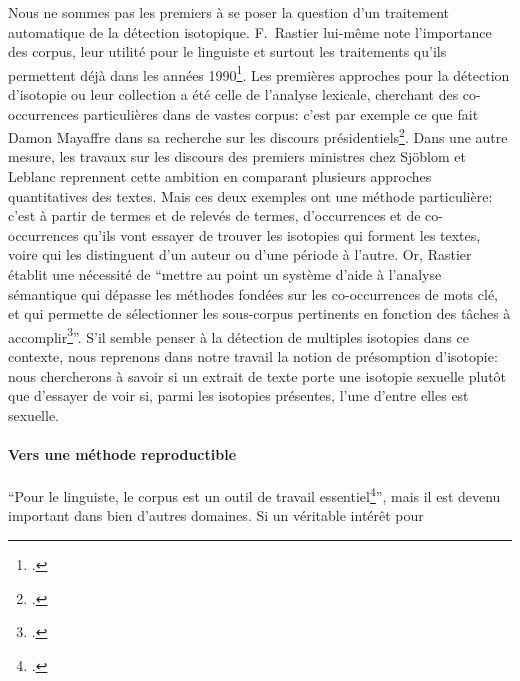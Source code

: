 Nous ne sommes pas les premiers à se poser la question d'un traitement automatique de la détection isotopique. F.~Rastier lui-même note l'importance des corpus, leur utilité pour le linguiste et surtout les traitements qu'ils permettent déjà dans les années 1990\footcite{rastier_semantique_1996}. Les premières approches pour la détection d'isotopie ou leur collection a été celle de l'analyse lexicale, cherchant des co-occurrences particulières dans de vastes corpus: c'est par exemple ce que fait Damon Mayaffre dans sa recherche sur les discours présidentiels\footcite{mayaffre2008occurrence}. Dans une autre mesure, les travaux sur les discours des premiers ministres chez Sjöblom et Leblanc reprennent cette ambition en comparant plusieurs approches quantitatives des textes. Mais ces deux exemples ont une méthode particulière: c'est à partir de termes et de relevés de termes, d'occurrences et de co-occurrences qu'ils vont essayer de trouver les isotopies qui forment les textes, voire qui les distinguent d'un auteur ou d'une période à l'autre. Or, Rastier établit une nécessité de \enquote{mettre  au  point  un  système  d’aide à l’analyse  sémantique  qui dépasse les méthodes fondées sur les co-occurrences de mots clé, et qui permette de sélectionner les sous-corpus pertinents en fonction des tâches à accomplir\footcite[p.~31]{rastier_semantique_1996}}. S'il semble penser à la détection de multiples isotopies dans ce contexte, nous reprenons dans notre travail la notion de présomption d'isotopie: nous chercherons à savoir si un extrait de texte porte une isotopie sexuelle plutôt que d'essayer de voir si, parmi les isotopies présentes, l'une d'entre elles est sexuelle.

\paragraph{Vers une méthode reproductible}

\enquote{Pour le linguiste, le corpus est un outil de travail essentiel\footcite{pincemin1999semantique}}, mais il est devenu important dans bien d'autres domaines. Si un véritable intérêt pour




